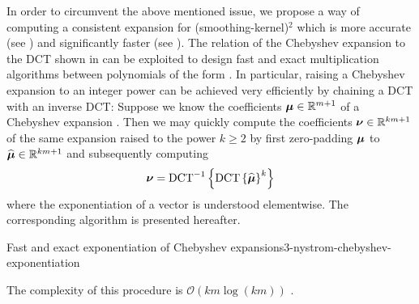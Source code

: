 In order to circumvent the above mentioned issue, we propose a way of computing
a consistent expansion for (\gls{smoothing-kernel})$^2$ which is more accurate
(see ) and significantly faster
(see ).
The relation of the Chebyshev expansion to the \gls{DCT} shown in 
can be exploited to design fast and exact multiplication algorithms between polynomials
of the form  \cite[proposition~3.1]{baszenski1997cosine}.
In particular, raising a Chebyshev expansion to an integer power can be achieved
very efficiently by chaining a \gls{DCT} with an inverse \gls{DCT}:
Suppose we know the coefficients $\boldsymbol{\mu} \in \mathbb{R}^{m+1}$
of a Chebyshev expansion .
Then we may quickly compute the coefficients $\boldsymbol{\nu} \in \mathbb{R}^{km+1}$
of the same expansion raised to the power $k \geq 2$ by first zero-padding
$\boldsymbol{\mu}$ to $\widehat{\boldsymbol{\mu}} \in \mathbb{R}^{km+1}$
and subsequently computing
\begin{equation}
    \boldsymbol{\nu} = \operatorname{DCT}^{-1}\left\{ \operatorname{DCT}\left\{\widehat{\boldsymbol{\mu}}\right\}^{k} \right\}
    \label{equ:3-nystrom-chebyshev-potentiate-coefficients}
\end{equation}
where the exponentiation of a vector is understood elementwise.
The corresponding algorithm is presented hereafter.
\begin{algo}{Fast and exact exponentiation of Chebyshev expansions}{3-nystrom-chebyshev-exponentiation}
    
\end{algo}
The complexity of this procedure is $\mathcal{O}(km \log(km))$ \cite{makhoul1980fct}.\\
\begin{table}[ht]
    \caption{Runtime comparison of the two approaches with which the coefficients
    of the Chebyshev expansion of a function. We average over 7 runs of the
    algorithms and repeat these runs 100 times to form the mean and standard
    deviation which are given in the below table. We refer to the interpolation
    of (\gls{smoothing-kernel})$^{2}$ with \cite[algorithm~1]{lin2017randomized} as \enquote{quadrature},
    to the interpolation of (\gls{smoothing-kernel})$^{2}$ with  as \enquote{DCT},
    and finally to the fast squaring algorithm  as \enquote{squaring}.
    For each algorithm, we interpolate a Gaussian \gls{smoothing-kernel} with \gls{smoothing-parameter} $=0.05$,
    at \gls{num-evaluation-points} $=1000$ points, for various values of \gls{chebyshev-degree}.}
    \label{tab:3-nystrom-timing-squared-interpolation}
    
\end{table}

